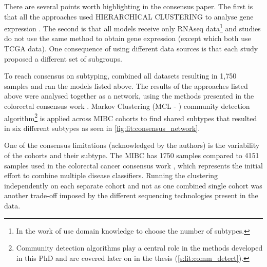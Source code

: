 There are several points worth highlighting in the consensus paper. The first is that all the approaches used \gls{HIERARCHICAL CLUSTERING} to analyse gene expression \citep{Mo2018-rl, Damrauer2014-tc, Choi2014-ed, Marzouka2018-ge, Rebouissou2014-ep,Robertson2017-mg}. The second is that all models receive only RNAseq data\footnote{In the work of \citeauthor{Robertson2017-mg} use domain knowledge to choose the number of subtypes.} and studies do not use the same method to obtain gene expression (except \citet{Robertson2017-mg, Mo2018-rl} which both use TCGA data). One consequence of using different data sources is that each study proposed a different set of subgroups. 

To reach consensus on subtyping, \citeauthor{Kamoun2020-tj} combined all datasets resulting in 1,750 samples and ran the models listed above. The results of the approaches listed above were analysed together as a network, using the methods presented in the colorectal consensus work \citep{Guinney2015-fy}. Markov Clustering (MCL - \citet{Van_Dongen2008-yj}) community detection algorithm\footnote{Community detection algorithms play a central role in the methods developed in this PhD and are covered later on in the thesis (\cref{s:lit:comm_detect}).} is applied across MIBC cohorts to find shared subtypes that resulted in six different subtypes as seen in \cref{fig:lit:consensus_network}. 


One of the consensus limitations (acknowledged by the authors) is the variability of the cohorts and their subtype. The MIBC has 1750 samples compared to 4151 samples used in the colorectal cancer consensus work \citep{Guinney2015-fy}, which represents the initial effort to combine multiple disease classifiers. Running the clustering independently on each separate cohort and not as one combined single cohort was another trade-off imposed by the different sequencing technologies present in the data. 

